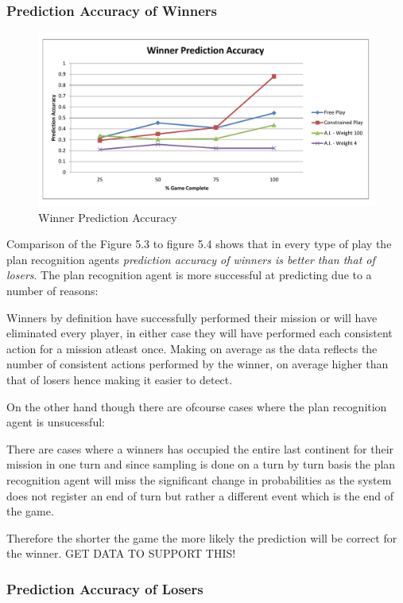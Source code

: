 \documentclass[parskip]{cs4rep}
\begin{document}
\subsubsection{Prediction Accuracy of Winners}

\begin{figure}[h]
\centerline{
\includegraphics[width=\textwidth]{images/winner-graph.pdf}
}
\caption{Winner Prediction Accuracy}
\label{fig:dom-debug-gui}
\end{figure} 

Comparison of the Figure 5.3 to figure 5.4 shows that in every type of play the plan recognition agents \textit{prediction accuracy of winners is better than that of losers}. The plan recognition agent is more successful at predicting due to a number of reasons:

Winners by definition have successfully performed their mission or will have eliminated every player, in either case they will have performed each consistent action for a mission atleast once. Making on average as the data reflects the number of consistent actions performed by the winner, on average higher than that of losers hence making it easier to detect.

On the other hand though there are ofcourse cases where the plan recognition agent is unsucessful: 

There are cases where a winners has occupied the entire last continent for their mission in one turn and since sampling is done on a turn by turn basis the plan recognition agent will miss the significant change in probabilities as the system does not register an end of turn but rather a different event which is the end of the game.

Therefore the shorter the game the more likely the prediction will be correct for the winner. GET DATA TO SUPPORT THIS! 

\subsubsection{Prediction Accuracy of Losers}
\end{document}
